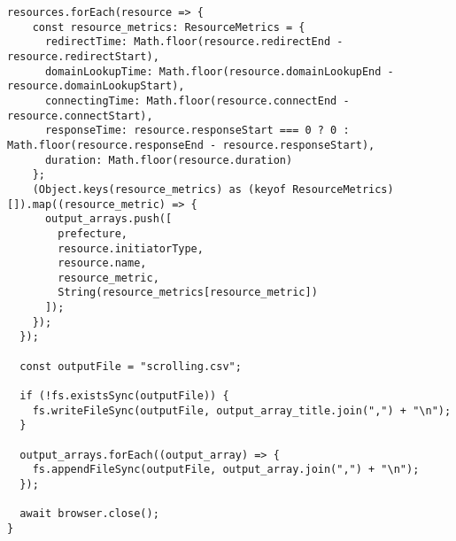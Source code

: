 \begin{lstlisting}[caption={PuppeteerとResource Timing APIを用いたスクロール時の画像の読み込み時間の測定},label={lst:PuppeteerとResource Timing APIを用いたスクロール時の画像の読み込み時間の測定}]
  resources.forEach(resource => {
    const resource_metrics: ResourceMetrics = {
      redirectTime: Math.floor(resource.redirectEnd - resource.redirectStart),
      domainLookupTime: Math.floor(resource.domainLookupEnd - resource.domainLookupStart),
      connectingTime: Math.floor(resource.connectEnd - resource.connectStart),
      responseTime: resource.responseStart === 0 ? 0 : Math.floor(resource.responseEnd - resource.responseStart),
      duration: Math.floor(resource.duration)
    };
    (Object.keys(resource_metrics) as (keyof ResourceMetrics)[]).map((resource_metric) => {
      output_arrays.push([
        prefecture,
        resource.initiatorType,
        resource.name,
        resource_metric,
        String(resource_metrics[resource_metric])
      ]);
    });
  });

  const outputFile = "scrolling.csv";

  if (!fs.existsSync(outputFile)) {
    fs.writeFileSync(outputFile, output_array_title.join(",") + "\n");
  }

  output_arrays.forEach((output_array) => {
    fs.appendFileSync(outputFile, output_array.join(",") + "\n");
  });

  await browser.close();
}

\end{lstlisting}

